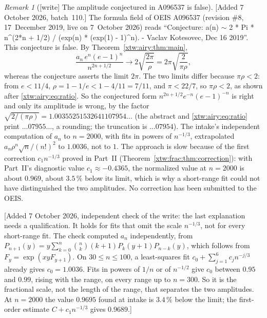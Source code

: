 \documentclass[11pt]{article}
\theoremstyle{remark}\newtheorem{remark}[theorem]{Remark}
\begin{document}
\begin{remark}[\textsf{[write]} The amplitude conjectured in A096537 is false]\label{xtw:airy:rem:oeis537}
[Added 7 October 2026, batch~110.] The formula field of OEIS A096537
(revision \#8, 17~December 2019, live on 7~October 2026) reads ``Conjecture:
a(n) $\sim$ 2 * Pi * n\^{}(2*n + 1/2) / (exp(n) * (exp(1) - 1)\^{}n). -
Vaclav Kotesovec, Dec 16 2019''. This conjecture is false. By
Theorem~\ref{xtw:airy:thm:main},
\[
 \frac{a_n\,e^n(e-1)^n}{n^{2n+1/2}}\longrightarrow2\sqrt{\frac{2\pi}{\rho}}
 =2\pi\sqrt{\frac{2}{\pi\rho}},
\]
whereas the conjecture asserts the limit $2\pi$. The two limits differ because
$\pi\rho<2$: from $e<11/4$, $\rho=1-1/e<1-4/11=7/11$, and $\pi<22/7$, so
$\pi\rho<2$, as shown after \eqref{xtw:airy:eq:ratio}. So the conjectured form
$n^{2n+1/2}e^{-n}(e-1)^{-n}$ is right and only its amplitude is wrong, by the
factor $\sqrt{2/(\pi\rho)}=1.00355251532641107954\ldots$ (the abstract and
\eqref{xtw:airy:eq:ratio} print $\ldots07955\ldots$, a rounding; the
truncation is $\ldots07954$). The intake's independent computation of $a_n$
to $n=2000$, with fits in powers of $n^{-1/3}$, extrapolated
$a_n\rho^n\sqrt n/(n!)^2$ to $1.0036$, not to $1$. The approach is slow because
of the first correction $c_1n^{-1/3}$ proved in Part~II
(Theorem~\ref{xtw:frac:thm:correction}): with Part~II's diagnostic value
$c_1\approx-0.4365$, the normalized value at $n=2000$ is about $0.969$, about
$3.5\,\%$ below its limit, which is why a short-range fit could not have
distinguished the two amplitudes. No correction has been submitted to the
OEIS.

[Added 7 October 2026, independent check of the write: the last explanation
needs a qualification. It holds for fits that omit the scale $n^{-1/3}$, not
for every short-range fit. The check computed $a_n$ independently, from
$P_{n+1}(y)=y\sum_{k=0}^n\binom nk(k+1)P_k(y+1)P_{n-k}(y)$, which follows
from $F_y=\exp(xyF_{y+1})$. On $30\le n\le100$, a least-squares fit
$c_0+\sum_{j=1}^6c_jn^{-j/3}$ already gives $c_0=1.0036$. Fits in powers of
$1/n$ or of $n^{-1/2}$ give $c_0$ between $0.95$ and $0.99$, rising with the
range, on every range up to $n=300$. So it is the fractional scale, not the
length of the range, that separates the two amplitudes. At $n=2000$ the value
$0.9695$ found at intake is $3.4\,\%$ below the limit; the first-order
estimate $C+c_1n^{-1/3}$ gives $0.9689$.]
\end{remark}
\end{document}
